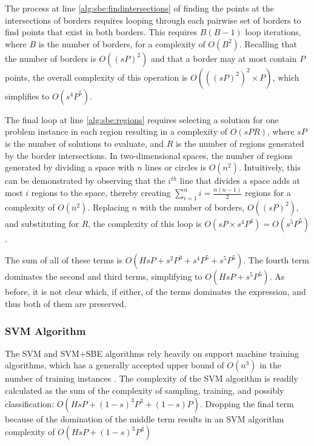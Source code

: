The process at line \ref{alg:sbe:findintersections} of finding the points at the intersections of borders requires looping through each pairwise set of borders to find points that exist in both borders.  This requires $B(B-1)$ loop iterations, where $B$ is the number of borders, for a complexity of $O(B^2)$.  Recalling that the number of borders is $O((sP)^2)$ and that a border may at most contain $P$ points, the overall complexity of this operation is $O(((sP)^2)^2 \times P)$, which simplifies to $O(s^4P^5)$.

The final loop at line \ref{alg:sbe:regions} requires selecting a solution for  one problem instance in each region resulting in a complexity of $O(sPR)$, where $sP$ is the number of solutions to evaluate, and $R$ is the number of regions generated by the border intersections.  In two-dimensional spaces, the number of regions generated by dividing a space with $n$ lines or circles is $O(n^2)$.  Intuitively, this can be demonstrated by observing that the $i^{th}$ line that divides a space adds at most $i$ regions to the space, thereby creating $\sum\nolimits_{i=1}^{n}i = \frac{n(n-1)}{2}$ regions for a complexity of $O(n^2)$.  Replacing $n$ with the number of borders, $O((sP)^2)$, and substituting for $R$, the complexity of this loop is $O(sP \times s^4P^4) = O(s^5P^5)$.

The sum of all of these terms is $O(HsP + s^2P^3 + s^4P^5 + s^5P^5)$.  The fourth term dominates the second and third terms, simplifying to  $O(HsP + s^5P^5)$.  As before, it is not clear which, if either, of the terms dominates the expression, and thus both of them are preserved.

\subsubsection{SVM Algorithm} The SVM and SVM+SBE algorithms rely heavily on support machine training algorithms, which has a generally accepted upper bound of $O(n^3)$ in the number of training instances \citep{bottou2007support,List09svm-optimization}.  The complexity of the SVM algorithm is readily calculated as the sum of the complexity of sampling, training, and possibly classification: $O(HsP + (1-s)^3P^3 + (1-s)P)$.  Dropping the final term because of the domination of the middle term results in an SVM algorithm complexity of $O(HsP + (1-s)^3P^3)$

